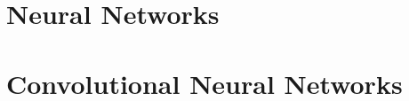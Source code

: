 %
%

\chapter{Neural Networks}\label{ch:machine_learning:neural_networks}


\chapter{Convolutional Neural Networks}\label{ch:machine_learning:convolutional_neural_networks}
